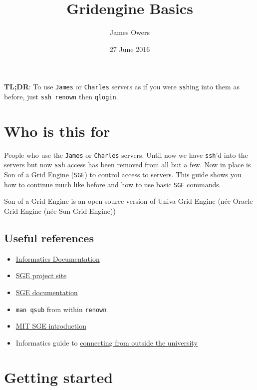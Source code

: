 \documentclass[]{article}
\title{Gridengine Basics}
\author{James Owers}
\date{27 June 2016}
\begin{document}
\maketitle


{
\hypersetup{linkcolor=black}
\setcounter{tocdepth}{2}
\tableofcontents
}
\textbf{TL;DR}: To use \texttt{James} or \texttt{Charles} servers as if
you were \texttt{ssh}ing into them as before, just \texttt{ssh renown}
then \texttt{qlogin}.

\section{Who is this for}\label{who-is-this-for}

People who use the \texttt{James} or \texttt{Charles} servers. Until now
we have \texttt{ssh}'d into the servers but now \texttt{ssh} access has
been removed from all but a few. Now in place is Son of a Grid Engine
(\texttt{SGE}) to control access to servers. This guide shows you how to
continue much like before and how to use basic \texttt{SGE} commands.

Son of a Grid Engine is an open source version of Univa Grid Engine (née
Oracle Grid Engine (née Sun Grid Engine))

\subsection{Useful references}\label{useful-references}

\begin{itemize}
\itemsep1pt\parskip0pt
\item
  \href{http://computing.help.inf.ed.ac.uk/james-and-charles-cluster}{Informatics
  Documentation}
\item
  \href{https://arc.liv.ac.uk/trac/SGE}{SGE project site}
\item
  \href{http://arc.liv.ac.uk/SGE/htmlman/manuals.html}{SGE
  documentation}
\item
  \texttt{man qsub} from within \texttt{renown}
\item
  \href{http://star.mit.edu/cluster/docs/0.92rc2/guides/sge.html}{MIT
  SGE introduction}
\item
  Informatics guide to
  \href{http://computing.help.inf.ed.ac.uk/connecting-home-overview}{connecting
  from outside the university}
\end{itemize}

\section{Getting started}\label{getting-started}
\end{document}
